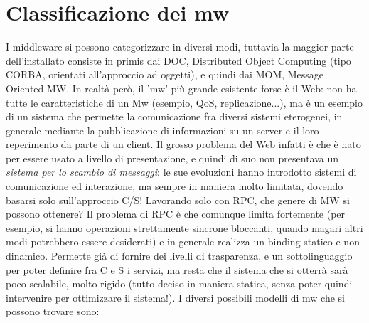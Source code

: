 \section{Classificazione dei mw}
I middleware si possono categorizzare in diversi modi, tuttavia la maggior parte dell'installato consiste in primis
dai DOC, Distributed Object Computing (tipo CORBA, orientati all'approccio ad oggetti), e quindi dai MOM, Message
Oriented MW. In realtà però, il 'mw' più grande esistente forse è il Web: non ha tutte le caratteristiche di un Mw
(esempio, QoS, replicazione...), ma è un esempio di un sistema che permette la comunicazione fra diversi sistemi
eterogenei, in generale mediante la pubblicazione di informazioni su un server e il loro reperimento da parte di un
client. Il grosso problema del Web infatti è che è nato per essere usato a livello di presentazione, e quindi di suo
non presentava un \textit{sistema per lo scambio di messaggi}: le sue evoluzioni hanno introdotto sistemi di
comunicazione ed interazione, ma sempre in maniera molto limitata, dovendo basarsi solo sull'approccio C/S!
Lavorando solo con RPC, che genere di MW si possono ottenere? Il problema di RPC è che comunque limita fortemente
(per esempio, si hanno operazioni strettamente sincrone bloccanti, quando magari altri modi potrebbero essere
desiderati) e in generale realizza un binding statico e non dinamico. Permette già di fornire dei livelli di
trasparenza, e un sottolinguaggio per poter definire fra C e S i servizi, ma resta che il sistema che si otterrà sarà
poco scalabile, molto rigido (tutto deciso in maniera statica, senza poter quindi intervenire per ottimizzare il
sistema!).
I diversi possibili modelli di mw che si possono trovare sono:

